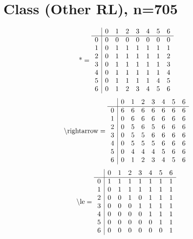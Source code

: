 \documentclass[11pt]{article}
\begin{document}
\section{Class (Other RL), n=705}
\[\text{*} = 
\begin{array}{r | r r r r r r r}
 & 0 & 1 & 2 & 3 & 4 & 5 & 6 \\ \hline
0 & 0 & 0 & 0 & 0 & 0 & 0 & 0 \\
1 & 0 & 1 & 1 & 1 & 1 & 1 & 1 \\
2 & 0 & 1 & 1 & 1 & 1 & 1 & 2 \\
3 & 0 & 1 & 1 & 1 & 1 & 1 & 3 \\
4 & 0 & 1 & 1 & 1 & 1 & 1 & 4 \\
5 & 0 & 1 & 1 & 1 & 1 & 4 & 5 \\
6 & 0 & 1 & 2 & 3 & 4 & 5 & 6 \\
\end{array}
\]
\[\text{\textbackslash rightarrow} = 
\begin{array}{r | r r r r r r r}
 & 0 & 1 & 2 & 3 & 4 & 5 & 6 \\ \hline
0 & 6 & 6 & 6 & 6 & 6 & 6 & 6 \\
1 & 0 & 6 & 6 & 6 & 6 & 6 & 6 \\
2 & 0 & 5 & 6 & 5 & 6 & 6 & 6 \\
3 & 0 & 5 & 5 & 6 & 6 & 6 & 6 \\
4 & 0 & 5 & 5 & 5 & 6 & 6 & 6 \\
5 & 0 & 4 & 4 & 4 & 5 & 6 & 6 \\
6 & 0 & 1 & 2 & 3 & 4 & 5 & 6 \\
\end{array}
\]
\[\text{\textbackslash le} = 
\begin{array}{r | r r r r r r r}
 & 0 & 1 & 2 & 3 & 4 & 5 & 6 \\ \hline
0 & 1 & 1 & 1 & 1 & 1 & 1 & 1 \\
1 & 0 & 1 & 1 & 1 & 1 & 1 & 1 \\
2 & 0 & 0 & 1 & 0 & 1 & 1 & 1 \\
3 & 0 & 0 & 0 & 1 & 1 & 1 & 1 \\
4 & 0 & 0 & 0 & 0 & 1 & 1 & 1 \\
5 & 0 & 0 & 0 & 0 & 0 & 1 & 1 \\
6 & 0 & 0 & 0 & 0 & 0 & 0 & 1 \\
\end{array}
\]
\end{document}
